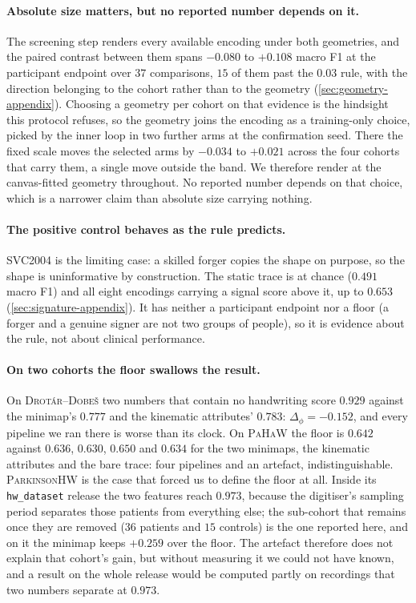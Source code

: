 \documentclass{article}
\begin{document}
\paragraph{Absolute size matters, but no reported number depends on it.} The screening step
renders every available encoding under both geometries, and the paired contrast between them spans
$-0.080$ to $+0.108$ macro F1 at the participant endpoint over $37$ comparisons, $15$ of them past
the $0.03$ rule, with the direction belonging to the cohort rather than to the geometry
(\cref{sec:geometry-appendix}). Choosing a geometry per cohort on that evidence is the hindsight
this protocol refuses, so the geometry joins the encoding as a training-only choice, picked by the
inner loop in two further arms at the confirmation seed. There the fixed scale moves the selected
arms by $-0.034$ to $+0.021$ across the
four cohorts that carry them, a single move outside the band. We therefore render at the
canvas-fitted geometry throughout. No reported number depends on that choice, which is a narrower
claim than absolute size carrying nothing.

\paragraph{The positive control behaves as the rule predicts.} \textsc{SVC2004} is the limiting
case: a skilled forger copies the shape on purpose, so the shape is uninformative by construction.
The static trace is at chance ($0.491$ macro F1) and all eight encodings carrying a signal score
above it, up to $0.653$ (\cref{sec:signature-appendix}). It has neither a participant endpoint nor a
floor (a forger and a genuine signer are not two groups of people), so it is evidence about the
rule, not about clinical performance.

\paragraph{On two cohorts the floor swallows the result.} On \textsc{Drot\'ar--Dobe\v{s}} two
numbers that contain no handwriting score $0.929$ against the minimap's $0.777$ and the kinematic
attributes' $0.783$: $\Delta_\phi = -0.152$, and every pipeline we ran there is worse than its
clock. On \textsc{PaHaW} the floor is $0.642$ against $0.636$, $0.630$, $0.650$ and $0.634$ for the
two minimaps, the kinematic attributes and the bare trace: four pipelines and an artefact,
indistinguishable.
\textsc{ParkinsonHW} is the case that forced us to define the floor at all. Inside its
\texttt{hw\_dataset} release the two features reach $0.973$, because the digitiser's sampling period
separates those patients from everything else; the sub-cohort that remains once they are removed
($36$ patients and $15$ controls) is the one reported here, and on it the minimap keeps $+0.259$
over the floor. The artefact therefore does not explain that cohort's gain, but without measuring
it we could not have known, and a result on the whole release would be computed partly on recordings
that two numbers separate at $0.973$.
\end{document}
